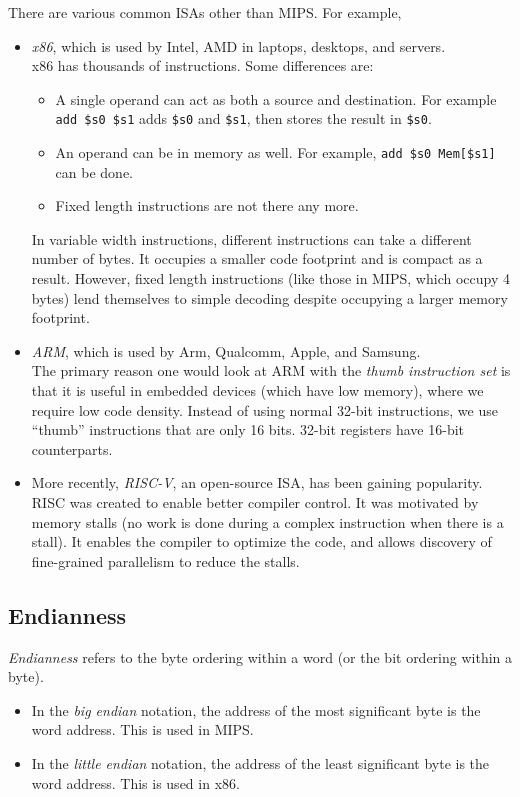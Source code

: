 \documentclass{article}
\begin{document}
			There are various common ISAs other than MIPS. For example,
			\begin{itemize}
				\item \emph{x86}, which is used by Intel, AMD in laptops, desktops, and servers.\\
				x86 has thousands of instructions. Some differences are:
				\begin{itemize}
					\item A single operand can act as both a source and destination. For example \texttt{add \$s0 \$s1} adds \texttt{\$s0} and \texttt{\$s1}, then stores the result in \texttt{\$s0}.
					\item An operand can be in memory as well. For example, \texttt{add \$s0 Mem[\$s1]} can be done.
					\item Fixed length instructions are not there any more.
				\end{itemize}
				In variable width instructions, different instructions can take a different number of bytes. It occupies a smaller code footprint and is compact as a result. However, fixed length instructions (like those in MIPS, which occupy 4 bytes) lend themselves to simple decoding despite occupying a larger memory footprint.

				\item \emph{ARM}, which is used by Arm, Qualcomm, Apple, and Samsung.\\
				The primary reason one would look at ARM with the \emph{thumb instruction set} is that it is useful in embedded devices (which have low memory), where we require low code density. Instead of using normal 32-bit instructions, we use ``thumb'' instructions that are only 16 bits. 32-bit registers have 16-bit counterparts.
				\item More recently, \emph{RISC-V}, an open-source ISA, has been gaining popularity.\\
			RISC was created to enable better compiler control. It was motivated by memory stalls (no work is done during a complex instruction when there is a stall). It enables the compiler to optimize the code, and allows discovery of fine-grained parallelism to reduce the stalls.
			\end{itemize}


		\subsection{Endianness}

			\emph{Endianness} refers to the byte ordering within a word (or the bit ordering within a byte).
			\begin{itemize}
				\item In the \emph{big endian} notation, the address of the most significant byte is the word address. This is used in MIPS.
				\item In the \emph{little endian} notation, the address of the least significant byte is the word address. This is used in x86.
			\end{itemize}
\end{document}
